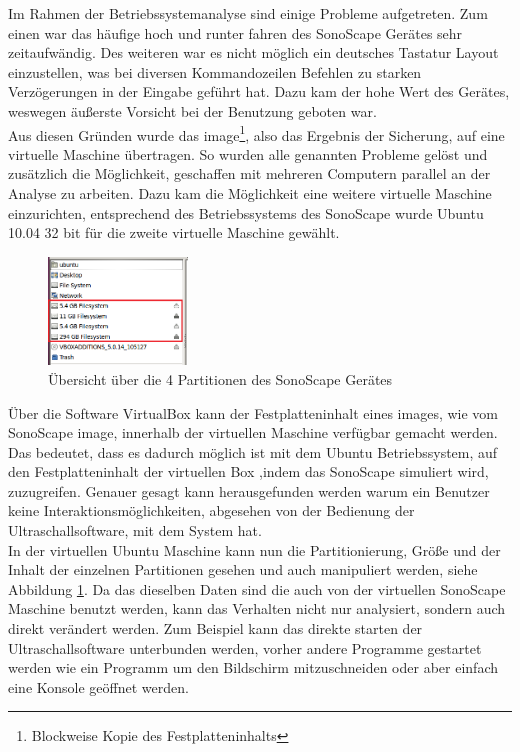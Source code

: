Im Rahmen der Betriebssystemanalyse sind einige Probleme aufgetreten. Zum einen war das häufige hoch und runter fahren des SonoScape Gerätes sehr zeitaufwändig. Des weiteren war es nicht möglich ein deutsches Tastatur Layout einzustellen, was bei diversen Kommandozeilen Befehlen zu starken Verzögerungen in der Eingabe geführt hat. Dazu kam der hohe Wert des Gerätes, weswegen äußerste Vorsicht bei der Benutzung geboten war.\\
Aus diesen Gründen wurde das image\footnote{Blockweise Kopie des Festplatteninhalts}, also das Ergebnis der Sicherung, auf eine virtuelle Maschine übertragen. So wurden alle genannten Probleme gelöst und zusätzlich die Möglichkeit, geschaffen mit mehreren Computern parallel an der Analyse zu arbeiten. Dazu kam die Möglichkeit eine weitere virtuelle Maschine einzurichten, entsprechend des Betriebssystems des SonoScape wurde Ubuntu 10.04 32 bit für die zweite virtuelle Maschine gewählt.\\
\begin{figure}
\vspace{-19pt}
\centering
\includegraphics*[width =0.33\textwidth]{Sonoscape_Analyse/Anzahl_Festplatten}
\caption{{\small Übersicht über die 4 Partitionen des SonoScape Gerätes}}
\label{fig:Festplatte}
\end{figure}
Über die Software VirtualBox kann der Festplatteninhalt eines images, wie vom SonoScape image, innerhalb der virtuellen Maschine verfügbar gemacht werden. Das bedeutet, dass es dadurch möglich ist mit dem Ubuntu Betriebssystem, auf den Festplatteninhalt der virtuellen Box ,indem das SonoScape simuliert wird, zuzugreifen. Genauer gesagt kann herausgefunden werden warum ein Benutzer keine Interaktionsmöglichkeiten, abgesehen von der Bedienung der Ultraschallsoftware, mit dem System hat.\\
In der virtuellen Ubuntu Maschine kann nun die Partitionierung, Größe und der Inhalt der einzelnen Partitionen gesehen und auch manipuliert werden, siehe Abbildung \ref{fig:Festplatte}. Da das dieselben Daten sind die auch von der virtuellen SonoScape Maschine benutzt werden, kann das Verhalten nicht nur analysiert, sondern auch direkt verändert werden.
Zum Beispiel kann das direkte starten der Ultraschallsoftware unterbunden werden, vorher andere Programme gestartet werden wie ein Programm um den Bildschirm mitzuschneiden oder aber einfach eine Konsole geöffnet werden.
